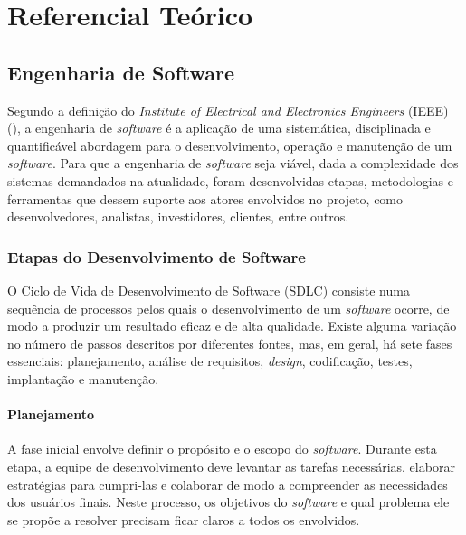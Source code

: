 

\chapter{Referencial Teórico}\label{cap:fundamentacao}

\section{Engenharia de Software}
Segundo a definição do \textit{Institute of Electrical and Electronics Engineers} (IEEE) (\citeyear{159342}), a engenharia de \textit{software} é a aplicação de uma sistemática, disciplinada e quantificável abordagem para o desenvolvimento, operação e manutenção de um \textit{software}. Para que a engenharia de \textit{software} seja viável, dada a complexidade dos sistemas demandados na atualidade, foram desenvolvidas etapas, metodologias e ferramentas que dessem suporte aos atores envolvidos no projeto, como desenvolvedores, analistas, investidores, clientes, entre outros.

\subsection{Etapas do Desenvolvimento de Software}
O Ciclo de Vida de Desenvolvimento de Software (SDLC) consiste numa sequência de processos pelos quais o desenvolvimento de um \textit{software} ocorre, de modo a produzir um resultado eficaz e de alta qualidade. Existe alguma variação no número de passos descritos por diferentes fontes, mas, em geral, há sete fases essenciais: planejamento, análise de requisitos, \textit{design}, codificação, testes, implantação e manutenção.

\subsubsection{Planejamento}

A fase inicial envolve definir o propósito e o escopo do \textit{software}. Durante esta etapa, a equipe de desenvolvimento deve levantar as tarefas necessárias, elaborar estratégias para cumpri-las e colaborar de modo a compreender as necessidades dos usuários finais. Neste processo, os objetivos do \textit{software} e qual problema ele se propõe a resolver precisam ficar claros a todos os envolvidos.

